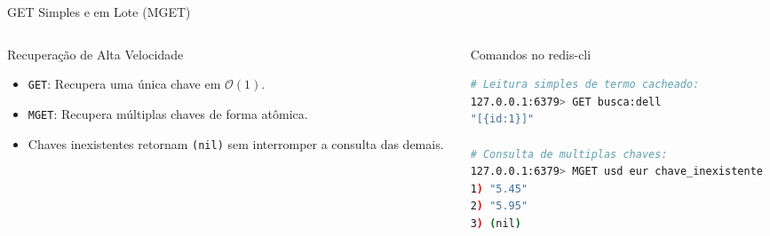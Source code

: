 \begin{frame}[fragile]{GET Simples e em Lote (MGET)}
  \begin{columns}[T]
    \begin{column}{0.48\textwidth}
      \alert{Recuperação de Alta Velocidade}\par
      \small
      \begin{itemize}
        \item \texttt{GET}: Recupera uma única chave em $\mathcal{O}(1)$.
        \item \texttt{MGET}: Recupera múltiplas chaves de forma atômica.
        \item Chaves inexistentes retornam \texttt{(nil)} sem interromper a consulta das demais.
      \end{itemize}
    \end{column}
    \begin{column}{0.50\textwidth}
      \alert{Comandos no redis-cli}\par
      \begin{lstlisting}[language=bash]
# Leitura simples de termo cacheado:
127.0.0.1:6379> GET busca:dell
"[{id:1}]"

# Consulta de multiplas chaves:
127.0.0.1:6379> MGET usd eur chave_inexistente
1) "5.45"
2) "5.95"
3) (nil)
      \end{lstlisting}
    \end{column}
  \end{columns}
\end{frame}


